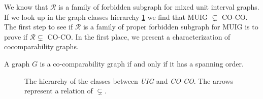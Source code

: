 We know that $\mathcal{R}$ is a family of forbidden subgraph for mixed unit interval graphs. If we look up in the graph classes hierarchy \ref{fig:hierarchyMUIG} we find that MUIG $\subsetneq$ CO-CO. The first step to see if $\mathcal{R}$ is a family of proper forbidden subgraph for MUIG is to prove if $\mathcal{R} \subsetneq$ CO-CO. In the first place, we present a characterization of cocomparability graphs.

\begin{theorem}
  \label{theo:spanning}
  A graph $G$ is a co-comparability graph if and only if it has a spanning order.
\end{theorem}


\begin{figure}
\begin{center}
\begin{scaletikzpicturetowidth}{\textwidth}
\end{scaletikzpicturetowidth}
\end{center}
\caption{The hierarchy of the classes between \emph{UIG} and \emph{CO-CO}. The arrows represent a relation of $\subsetneq$.}\label{fig:hierarchyMUIG}
\end{figure}


